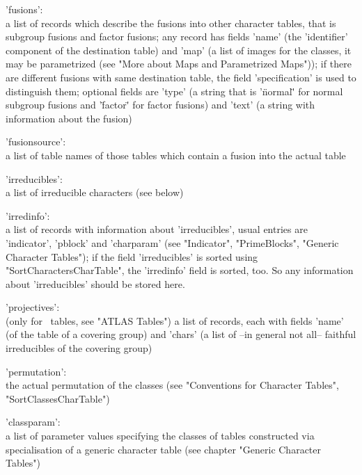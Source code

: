 'fusions':\\ a list of records which describe the fusions into other
             character tables, that is subgroup fusions and factor
             fusions; any record has fields 'name' (the 'identifier'
             component of the destination table) and 'map' (a list of
             images for the classes, it may be parametrized (see "More
             about Maps and Parametrized Maps"));
             if there are different fusions with same destination table,
             the field 'specification' is used to distinguish them;
             optional fields are 'type' (a string that is '\"normal\"'
             for normal subgroup fusions and '\"factor\"' for factor
             fusions) and 'text' (a string with information about the
             fusion)

'fusionsource':\\ a list of table names of those tables which contain a
                  fusion into the actual table

'irreducibles':\\ a list of irreducible characters (see below)

'irredinfo':\\ a list of records with information about 'irreducibles',
               usual entries are 'indicator', 'pblock' and 'charparam'
               (see "Indicator", "PrimeBlocks", "Generic Character
               Tables"); if the field 'irreducibles' is sorted using
               "SortCharactersCharTable", the 'irredinfo' field is
               sorted, too.  So any information about 'irreducibles'
               should be stored here.

'projectives':\\ (only for \ATLAS\ tables, see "ATLAS Tables") a list of
                 records, each with fields 'name' (of the table of a
                 covering group) and 'chars' (a list of --in general not
                 all-- faithful irreducibles of the covering group)

'permutation':\\ the actual permutation of the classes
                 (see "Conventions for Character Tables",
                 "SortClassesCharTable")

'classparam':\\ a list of parameter values specifying the classes of
                tables constructed via specialisation of a generic
                character table (see chapter "Generic Character Tables")

